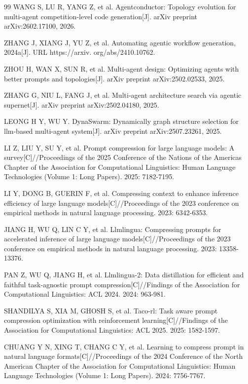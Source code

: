 \begin{thebibliography}{99}
WANG S, LU R, YANG Z, et al. Agentconductor: Topology evolution for multi-agent competition-level code generation[J]. arXiv preprint arXiv:2602.17100, 2026.

ZHANG J, XIANG J, YU Z, et al. Automating agentic workflow generation, 2024a[J]. URL https://arxiv. org/abs/2410.10762.

ZHOU H, WAN X, SUN R, et al. Multi-agent design: Optimizing agents with better prompts and topologies[J]. arXiv preprint arXiv:2502.02533, 2025.

ZHANG G, NIU L, FANG J, et al. Multi-agent architecture search via agentic supernet[J]. arXiv preprint arXiv:2502.04180, 2025.

LEONG H Y, WU Y. DynaSwarm: Dynamically graph structure selection for llm-based multi-agent system[J]. arXiv preprint arXiv:2507.23261, 2025.

LI Z, LIU Y, SU Y, et al. Prompt compression for large language models: A survey[C]//Proceedings of the 2025 Conference of the Nations of the Americas Chapter of the Association for Computational Linguistics: Human Language Technologies (Volume 1: Long Papers). 2025: 7182-7195.

LI Y, DONG B, GUERIN F, et al. Compressing context to enhance inference efficiency of large language models[C]//Proceedings of the 2023 conference on empirical methods in natural language processing. 2023: 6342-6353.

JIANG H, WU Q, LIN C Y, et al. Llmlingua: Compressing prompts for accelerated inference of large language models[C]//Proceedings of the 2023 conference on empirical methods in natural language processing. 2023: 13358-13376.

PAN Z, WU Q, JIANG H, et al. Llmlingua-2: Data distillation for efficient and faithful task-agnostic prompt compression[C]//Findings of the Association for Computational Linguistics: ACL 2024. 2024: 963-981.

SHANDILYA S, XIA M, GHOSH S, et al. Taco-rl: Task aware prompt compression optimization with reinforcement learning[C]//Findings of the Association for Computational Linguistics: ACL 2025. 2025: 1582-1597.

CHUANG Y N, XING T, CHANG C Y, et al. Learning to compress prompt in natural language formats[C]//Proceedings of the 2024 Conference of the North American Chapter of the Association for Computational Linguistics: Human Language Technologies (Volume 1: Long Papers). 2024: 7756-7767.


\end{thebibliography}
